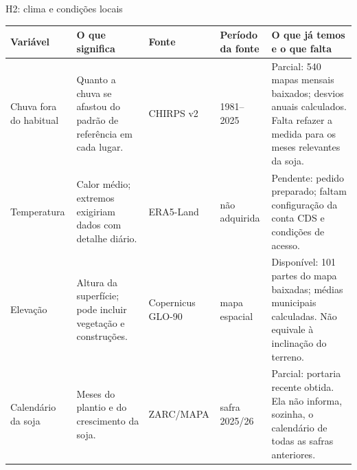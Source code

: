 \documentclass[aspectratio=169,11pt]{beamer}
\newcommand{\disp}{\textcolor{azul}{Disponível}}
\newcommand{\parcial}{\textcolor{orange!75!black}{Parcial}}
\newcommand{\pend}{\textcolor{red!70!black}{Pendente}}
\begin{document}
\begin{frame}{H2: clima e condições locais}
\fontsize{9}{11}\selectfont
\setlength{\tabcolsep}{3pt}
\begin{tabularx}{\textwidth}{P{1.9cm} P{3.0cm} P{2.1cm} P{1.7cm} X}
\toprule
\textbf{Variável} & \textbf{O que significa} & \textbf{Fonte} & \textbf{Período da fonte} & \textbf{O que já temos e o que falta} \\
\midrule
Chuva fora do habitual & Quanto a chuva se afastou do padrão de referência em cada lugar. & CHIRPS v2 & 1981--2025 & \parcial: 540 mapas mensais baixados; desvios anuais calculados. Falta refazer a medida para os meses relevantes da soja. \\
Temperatura & Calor médio; extremos exigiriam dados com detalhe diário. & ERA5-Land & não adquirida & \pend: pedido preparado; faltam configuração da conta CDS e condições de acesso. \\
Elevação & Altura da superfície; pode incluir vegetação e construções. & Copernicus GLO-90 & mapa espacial & \disp: 101 partes do mapa baixadas; médias municipais calculadas. Não equivale à inclinação do terreno. \\
Calendário da soja & Meses do plantio e do crescimento da soja. & ZARC/MAPA & safra 2025/26 & \parcial: portaria recente obtida. Ela não informa, sozinha, o calendário de todas as safras anteriores. \\
\bottomrule
\end{tabularx}
\end{frame}
\end{document}
